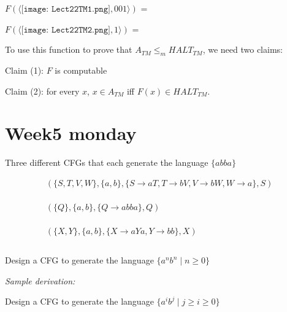 \documentclass[12pt, oneside]{article}
\begin{document}
    \vfill

    $F( \langle \texttt{[image: Lect22TM1.png]} ,  001  \rangle)$ =

    \vfill

    $F( \langle \texttt{[image: Lect22TM2.png]} ,  1  \rangle)$ =

    \vfill
    
    \newpage
    To use this function  to prove that $A_{TM} \leq_m HALT_{TM}$, we need  two claims:

    
    Claim (1): $F$ is computable \phantom{\hspace{2in}}
    
    \vfill

    Claim (2): for every  $x$,  $x \in  A_{TM}$ iff $F(x) \in HALT_{TM}$.  
    
    \vfill
     \vfill
\section*{Week5 monday}


  Three different CFGs that each generate the  language $\{abba\}$
  
  \begin{align*}
  & ( \{ S, T, V, W\}, \{a,b\}, \{ S \to aT, T \to bV, V \to bW, W \to a\}, S)\\
  & \\ 
  & \\ 
  & \\ 
  & ( \{ Q \}, \{a,b\}, \{Q \to abba\}, Q) \\
  & \\ 
  & \\ 
  & \\
  & ( \{ X,Y \}, \{a,b\}, \{X \to aYa, Y \to bb\}, X) 
  & \\ 
  & \\ 
  \end{align*} 

  Design a CFG to generate the  language $\{a^n b^n \mid  n  \geq  0\}$
  
  \vspace{100pt}
  
  {\it Sample derivation:} 
  
  \vspace{30pt}
  
  
  Design a CFG to generate the  language $\{a^i b^j \mid j \geq i  \geq 0\}$
  
  \vspace{100pt}
  
\end{document}
